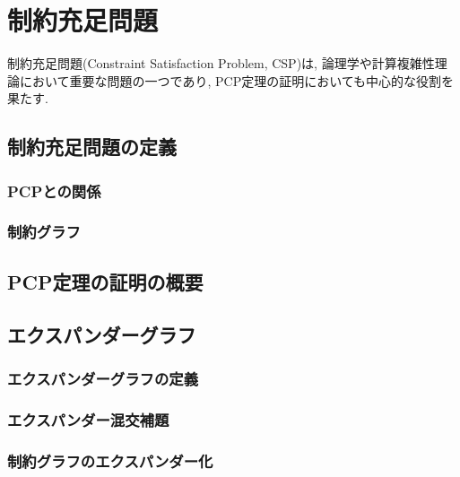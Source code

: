 \chapter{制約充足問題} \label{chap:CSP}
制約充足問題(Constraint Satisfaction Problem, CSP)は, 論理学や計算複雑性理論において重要な問題の一つであり,
PCP定理の証明においても中心的な役割を果たす.

\section{制約充足問題の定義}
\subsection{PCPとの関係}
\subsection{制約グラフ}

\section{PCP定理の証明の概要}

\section{エクスパンダーグラフ}
\subsection{エクスパンダーグラフの定義}
\subsection{エクスパンダー混交補題}
\subsection{制約グラフのエクスパンダー化}
